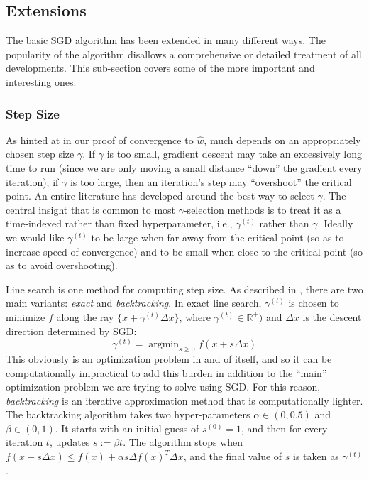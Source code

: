 \documentclass{article}
\DeclareMathOperator*{\argmin}{argmin}
\begin{document}
\subsection{Extensions}

The basic SGD algorithm has been extended in many different ways. The popularity of
the algorithm disallows a comprehensive or detailed treatment of all
developments. This sub-section covers some of the more important and interesting
ones.


\subsubsection{Step Size}

As hinted at in our proof of convergence to $\hat{w}$, much depends on
an appropriately chosen step size $\gamma$. If $\gamma$ is too small, gradient
descent may
take an excessively long time to run (since we are only moving a small distance
``down'' the gradient every iteration); if $\gamma$ is too large, then an
iteration's step may ``overshoot'' the critical point.
An entire literature has developed around the best way to select $\gamma$. The
central insight that is common to most $\gamma$-selection methods is to treat it
as a time-indexed rather than fixed hyperparameter, i.e., $\gamma^{(t)}$ rather
than $\gamma$. Ideally we would like $\gamma^{(t)}$ to be large when far away
from the critical point (so as to increase speed of convergence) and to be small
when close to the critical point (so as to avoid overshooting).

Line search is one method for computing step size. As described in
\cite{boyd2004convex}, there are two main variants: \textit{exact} and
\textit{backtracking}. In exact line search, $\gamma^{(t)}$ is chosen to minimize $f$
along the ray $\{x + \gamma^{(t)} \Delta x\}$, where $\gamma^{(t)} \in \mathbb{R}^+)$ and
$\Delta x$ is the descent direction determined by SGD:
\begin{equation}
	\gamma^{(t)} = \argmin_{s \geq 0} f(x + s\Delta x)
\end{equation}
This obviously is an optimization problem in and of itself, and
so it can be computationally impractical to add this burden in addition to the
``main'' optimization problem we are trying to solve using SGD. For this reason,
\textit{backtracking} is an iterative approximation method that is
computationally lighter. The backtracking algorithm takes two hyper-parameters
$\alpha \in (0, 0.5)$ and $\beta \in (0, 1)$. It starts with an initial guess of
$s^{(0)} = 1$, and then for every iteration $t$, updates $s := \beta t$. The
algorithm stops when $f(x + s \Delta x) \leq f(x) + \alpha s \Delta f(x)^T
\Delta x$, and the final value of $s$ is taken as $\gamma^{(t)}$. 
\end{document}
